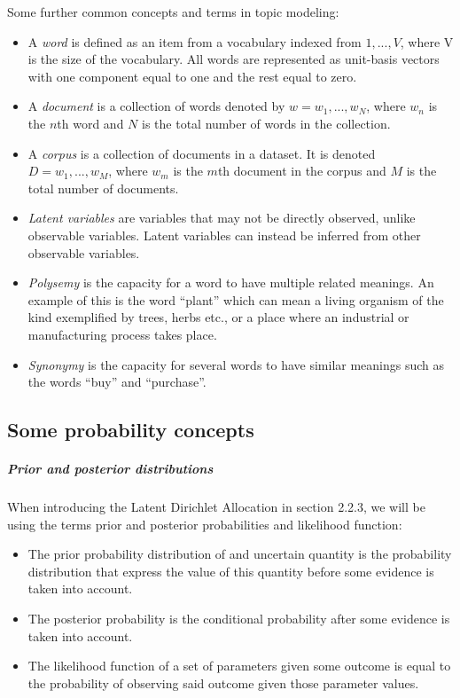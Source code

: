 \documentclass[12pt]{report}
\begin{document}
Some further common concepts and terms in topic modeling: 
\begin{itemize}
\item[] A \textit{word} is defined as an item from a vocabulary indexed from 
${1, ..., V}$, where V is the size of the vocabulary. All words are 
represented as unit-basis vectors with one component equal to one and 
the rest equal to zero.
\item[] A \textit{document} is a collection of words denoted by $w = {w_1, ..., w_N}$, 
where $w_n$ is the $n$th word and $N$ is the total number of words in the 
collection.
\item[] A \textit{corpus} is a collection of documents in a dataset. It is denoted 
$D = {w_1,..., w_M}$, where $w_m$ is the $m$th document in the corpus and 
$M$ is the total number of documents.
\item[] \textit{Latent variables} are variables that may not be directly observed, 
unlike observable variables. Latent variables can instead be inferred 
from other observable variables.
\item[] \textit{Polysemy} is the capacity for a word to have multiple related meanings. 
An example of this is the word “plant” which can mean a living organism of 
the kind exemplified by trees, herbs etc., or a place where an industrial or
manufacturing process takes place.
\item[] \textit{Synonymy} is the capacity for several words to have similar meanings such as
the words “buy” and “purchase”.
\end{itemize}

\subsection{Some probability concepts}

\subparagraph{Prior and posterior distributions}

When introducing the Latent Dirichlet Allocation in section 2.2.3, we 
will be using the terms prior and posterior probabilities and 
likelihood function:

\begin{itemize}
\item The prior probability distribution of and uncertain quantity is the 
probability distribution that express the value of this quantity before 
some evidence is taken into account.
\item The posterior probability is the conditional probability after some 
evidence is taken into account.
\item The likelihood function of a set of parameters given some outcome 
is equal to the probability of observing said outcome given those 
parameter values.
\end{itemize}
\end{document}
